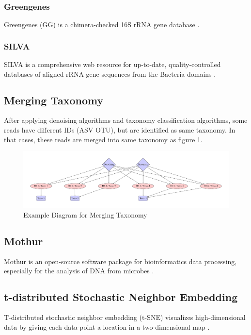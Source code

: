 \documentclass[a4paper]{article}
\begin{document}
            \subsubsection{Greengenes}
                Greengenes (GG) is a chimera-checked 16S rRNA gene database \cite{greengenes1}.

            \subsubsection{SILVA}
                SILVA is a comprehensive web resource for up-to-date, quality-controlled databases of aligned rRNA gene sequences from the Bacteria domains \cite{silva1, silva2}.

        \subsection{Merging Taxonomy}
            After applying denoising algorithms and taxonomy classification algorithms, some reads have different IDs (ASV OTU), but are identified as same taxonomy. In that cases, these reads are merged into same taxonomy as figure \ref{fig:merging}.

            \begin{figure}[p]
                \centering
                \includegraphics[width=0.5 \linewidth]{figures/tikz/merging.pdf}
                \caption{Example Diagram for Merging Taxonomy}
                \label{fig:merging}
            \end{figure}

        \subsection{Mothur}
            Mothur is an open-source software package for bioinformatics data processing, especially for the analysis of DNA from microbes \cite{mothur1}.

        \subsection[t-SNE]{t-distributed Stochastic Neighbor Embedding}
            T-distributed stochastic neighbor embedding (t-SNE) visualizes high-dimensional data by giving each data-point a location in a two-dimensional map \cite{tsne1}.
\end{document}
